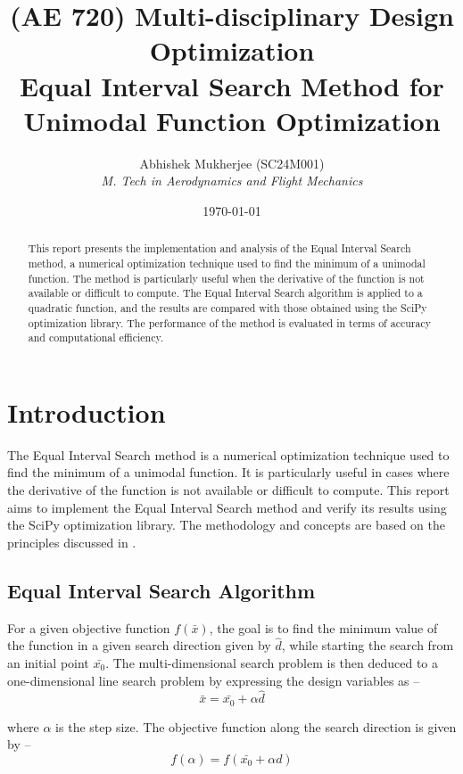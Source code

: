 \documentclass[11pt,a4paper]{article}
\title{{\Large (AE 720) Multi-disciplinary Design Optimization} \\ \textbf{Equal Interval Search Method for Unimodal Function Optimization}}
\author{Abhishek Mukherjee (SC24M001) \\ \textit{M. Tech in Aerodynamics and Flight Mechanics}}
\date{\today}
\begin{document}
\maketitle

\begin{abstract}
    This report presents the implementation and analysis of the Equal Interval Search method, a numerical optimization technique used to find the minimum of a unimodal function. The method is particularly useful when the derivative of the function is not available or difficult to compute. The Equal Interval Search algorithm is applied to a quadratic function, and the results are compared with those obtained using the SciPy optimization library. The performance of the method is evaluated in terms of accuracy and computational efficiency.
\end{abstract}

\section{Introduction}
    The Equal Interval Search method is a numerical optimization technique used to find the minimum of a unimodal function. It is particularly useful in cases where the derivative of the function is not available or difficult to compute. This report aims to implement the Equal Interval Search method and verify its results using the SciPy optimization library. The methodology and concepts are based on the principles discussed in \citet{ganguly2012engineering}.

\subsection{Equal Interval Search Algorithm}
For a given objective function \(f(\bar{x})\), the goal is to find the minimum value of the function in a given search direction given by \(\hat{d}\), while starting the search from an initial point \(\bar{x_0}\). The multi-dimensional search problem is then deduced to a one-dimensional line search problem by expressing the design variables as –
\begin{equation}
    \bar{x} = \bar{x_0} + \alpha \hat{d}
\end{equation}

where \(\alpha\) is the step size. The objective function along the search direction is given by –
\begin{equation}
    f(\alpha) = f(\bar{x_0} + \alpha d)    
\end{equation}
\end{document}
